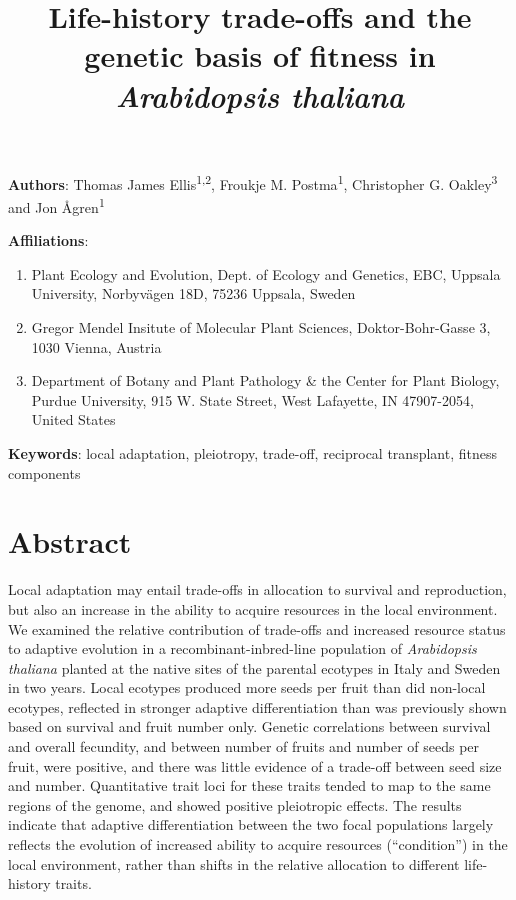 \documentclass[12pt,]{article}
\title{Life-history trade-offs and the genetic basis of fitness in \emph{Arabidopsis thaliana}}
\author{}
\date{}
\providecommand{\tightlist}{%
  \setlength{\itemsep}{0pt}\setlength{\parskip}{0pt}}
\begin{document}
\maketitle

\textbf{Authors}: Thomas James Ellis\textsuperscript{1,2}, Froukje M. Postma\textsuperscript{1}, Christopher G. Oakley\textsuperscript{3} and Jon Ågren\textsuperscript{1}

\textbf{Affiliations}:

\begin{enumerate}
\def\labelenumi{\arabic{enumi}.}
\tightlist
\item
  Plant Ecology and Evolution, Dept. of Ecology and Genetics, EBC, Uppsala University, Norbyvägen 18D, 75236 Uppsala, Sweden
\item
  Gregor Mendel Insitute of Molecular Plant Sciences, Doktor-Bohr-Gasse 3, 1030 Vienna, Austria
\item
  Department of Botany and Plant Pathology \& the Center for Plant Biology, Purdue University, 915 W. State Street, West Lafayette, IN 47907-2054, United States
\end{enumerate}

\textbf{Keywords}: local adaptation, pleiotropy, trade-off, reciprocal transplant, fitness components

\newpage

\hypertarget{abstract}{%
\section{Abstract}\label{abstract}}

Local adaptation may entail trade-offs in allocation to survival and reproduction, but also an increase in the ability to acquire resources in the local environment. We examined the relative contribution of trade-offs and increased resource status to adaptive evolution in a recombinant-inbred-line population of \emph{Arabidopsis thaliana} planted at the native sites of the parental ecotypes in Italy and Sweden in two years. Local ecotypes produced more seeds per fruit than did non-local ecotypes, reflected in stronger adaptive differentiation than was previously shown based on survival and fruit number only. Genetic correlations between survival and overall fecundity, and between number of fruits and number of seeds per fruit, were positive, and there was little evidence of a trade-off between seed size and number. Quantitative trait loci for these traits tended to map to the same regions of the genome, and showed positive pleiotropic effects. The results indicate that adaptive differentiation between the two focal populations largely reflects the evolution of increased ability to acquire resources (``condition'') in the local environment, rather than shifts in the relative allocation to different life-history traits.
\end{document}
